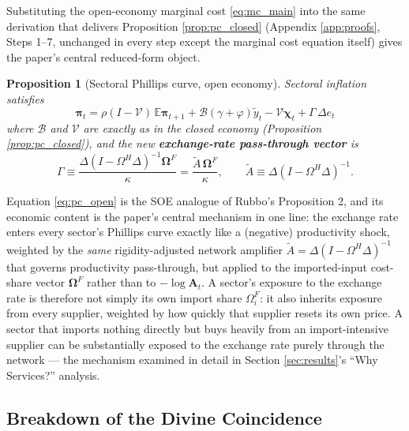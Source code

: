 \documentclass[12pt]{article}
\newtheorem{proposition}{Proposition}
\begin{document}
Substituting the open-economy marginal cost \eqref{eq:mc_main} into the same derivation that delivers
Proposition \ref{prop:pc_closed} (Appendix \ref{app:proofs}, Steps 1--7, unchanged in every step
except the marginal cost equation itself) gives the paper's central reduced-form object.

\begin{proposition}[Sectoral Phillips curve, open economy]
\label{prop:pc_open}
Sectoral inflation satisfies
\begin{equation}
    \boxed{\bm\pi_t = \rho(I-\mathcal V)\,\mathbb E\bm\pi_{t+1} + \mathcal B(\gamma+\varphi)\tilde y_t -
    \mathcal V\bm\chi_t + \Gamma\,\Delta e_t}
    \label{eq:pc_open}
\end{equation}
where $\mathcal B$ and $\mathcal V$ are exactly as in the closed economy (Proposition
\ref{prop:pc_closed}), and the new \textbf{exchange-rate pass-through vector} is
\begin{equation}
    \Gamma \equiv \frac{\Delta(I-\Omega^H\Delta)^{-1}\bm\Omega^F}{\kappa} = \frac{\tilde A\,\bm\Omega^F}{\kappa},
    \qquad \tilde A \equiv \Delta(I-\Omega^H\Delta)^{-1}.
    \label{eq:gamma_def}
\end{equation}
\end{proposition}

Equation \eqref{eq:pc_open} is the SOE analogue of Rubbo's Proposition 2, and its economic content is
the paper's central mechanism in one line: the exchange rate enters every sector's Phillips curve
exactly like a (negative) productivity shock, weighted by the \emph{same} rigidity-adjusted network
amplifier $\tilde A=\Delta(I-\Omega^H\Delta)^{-1}$ that governs productivity pass-through, but applied
to the imported-input cost-share vector $\bm\Omega^F$ rather than to $-\log\mathbf A_t$. A sector's
exposure to the exchange rate is therefore not simply its own import share $\Omega^F_i$: it also
inherits exposure from every supplier, weighted by how quickly that supplier resets its own price.
A sector that imports nothing directly but buys heavily from an import-intensive supplier can be
substantially exposed to the exchange rate purely through the network --- the mechanism examined in
detail in Section \ref{sec:results}'s ``Why Services?'' analysis.

\subsection{Breakdown of the Divine Coincidence}
\label{sec:dc_breakdown}
\end{document}

